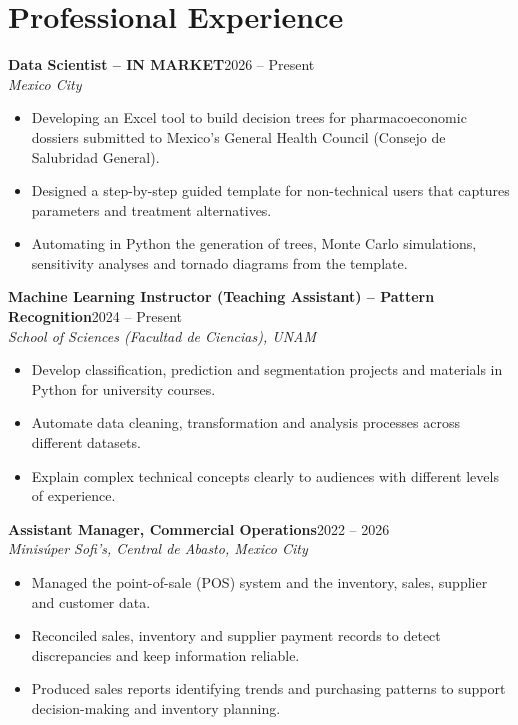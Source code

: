 \documentclass[10pt]{article}
\newcommand{\entry}[3]{\textbf{#1}\hfill #2\\\textit{#3}\par}
\begin{document}
\section*{Professional Experience}
\entry{Data Scientist -- IN MARKET}{2026 -- Present}{Mexico City}
\begin{itemize}
\item Developing an Excel tool to build decision trees for pharmacoeconomic dossiers submitted to Mexico's General Health Council (Consejo de Salubridad General).
\item Designed a step-by-step guided template for non-technical users that captures parameters and treatment alternatives.
\item Automating in Python the generation of trees, Monte Carlo simulations, sensitivity analyses and tornado diagrams from the template.
\end{itemize}
\vspace{5pt}
\entry{Machine Learning Instructor (Teaching Assistant) -- Pattern Recognition}{2024 -- Present}{School of Sciences (Facultad de Ciencias), UNAM}
\begin{itemize}
\item Develop classification, prediction and segmentation projects and materials in Python for university courses.
\item Automate data cleaning, transformation and analysis processes across different datasets.
\item Explain complex technical concepts clearly to audiences with different levels of experience.
\end{itemize}
\vspace{5pt}
\entry{Assistant Manager, Commercial Operations}{2022 -- 2026}{Minisúper Sofi’s, Central de Abasto, Mexico City}
\begin{itemize}
\item Managed the point-of-sale (POS) system and the inventory, sales, supplier and customer data.
\item Reconciled sales, inventory and supplier payment records to detect discrepancies and keep information reliable.
\item Produced sales reports identifying trends and purchasing patterns to support decision-making and inventory planning.
\end{itemize}
\end{document}
